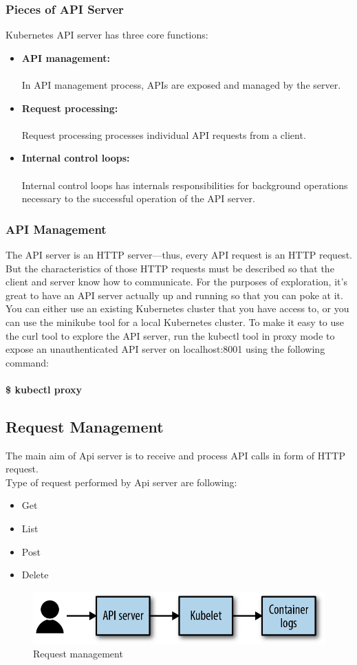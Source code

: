 \documentclass[12pt]{article}
\begin{document}
	\subsubsection{Pieces of API Server}
	Kubernetes API server has three core functions:
	\begin{itemize}
		\item \textbf{API management:}\\\\
		In API management process, APIs are exposed and managed by the server.
		\item \textbf{Request processing:}\\\\
		Request processing processes individual API requests from a client.
		\item \textbf{Internal control loops:}\\\\
		Internal control loops has internals responsibilities for background operations necessary to the successful operation of the API server.
	\end{itemize}
\subsubsection{API Management \cite{KubernetesManagement}}
The API server is an HTTP server—thus, every API request is an HTTP request. But the characteristics of those HTTP requests must be described so that the client and server know how to communicate. For the purposes of exploration, it’s great to have an API server actually up and running so that you can poke at it. You can either use an existing Kubernetes cluster that you have access to, or you can use the minikube tool for a local Kubernetes cluster. To make it easy to use the curl tool to explore the API server, run the kubectl tool in proxy mode to expose an unauthenticated API server on localhost:8001 using the following command:\\\\
\textbf{\$ kubectl proxy}
\subsection{Request Management}
The main aim of Api server is to receive and process API calls in form of HTTP request.\\
Type of request performed by Api server are following:
\begin{itemize}
	\item Get
	\item List
	\item Post
	\item Delete
\end{itemize}
\begin{figure}[h!]
	\begin{center}
		\includegraphics*[totalheight=0.1\textheight]{kubereqman}
		\caption{Request management}
	\end{center}
\end{figure}
\end{document}
